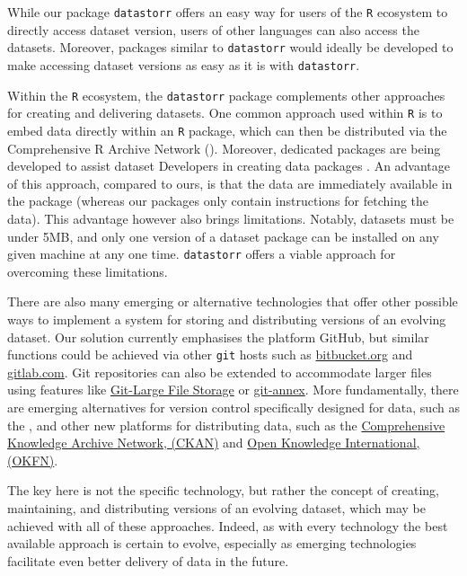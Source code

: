 \documentclass[a4paper,num-refs]{assets/oup-contemporary}
\begin{document}
While our package \texttt{datastorr} offers an easy way for users of the \texttt{R} ecosystem to directly access dataset version, users of other languages can also access the datasets. Moreover, packages similar to \texttt{datastorr} would ideally be developed to make accessing dataset versions as easy as it is with \texttt{datastorr}.

Within the \texttt{R} ecosystem, the \texttt{datastorr} package complements other approaches for creating and delivering datasets. One common approach used within \texttt{R} is to embed data directly within an \texttt{R} package, which can then be distributed via the Comprehensive R Archive Network (). Moreover, dedicated packages are being developed to assist dataset Developers in creating data packages \cite{Finak-2018}. An advantage of this approach, compared to ours, is that the data are immediately available in the package (whereas our packages only contain instructions for fetching the data). This advantage however also brings limitations. Notably, datasets must be under 5MB, and only one version of a dataset package can be installed on any given machine at any one time.  \texttt{datastorr} offers a viable approach for overcoming these limitations.

There are also many emerging or alternative technologies that offer other possible ways to implement a system for storing and distributing versions of an evolving dataset. Our solution currently emphasises the platform GitHub, but similar functions could be achieved via other \texttt{git} hosts such as \href{http://bitbucket.org}{bitbucket.org} and \href{http://gitlab.com}{gitlab.com}. Git repositories can also be extended to accommodate larger files using  features like \href{https://git-lfs.github.com/}{Git-Large File Storage} or \href{http://git-annex.branchable.com/}{git-annex}. More fundamentally, there are  emerging alternatives for version control specifically designed for data, such as the , and other new platforms for distributing data, such as the \href{https://en.wikipedia.org/wiki/CKAN}{Comprehensive Knowledge Archive Network, (CKAN)} and \href{https://okfn.org/}{Open Knowledge International, (OKFN)}. 

The key here is not the specific technology, but rather the concept of creating, maintaining, and distributing versions of an evolving dataset, which may be achieved with all of these approaches. Indeed, as with every technology the best available approach is certain to evolve, especially as emerging technologies facilitate even better delivery of data in the future.
\end{document}
